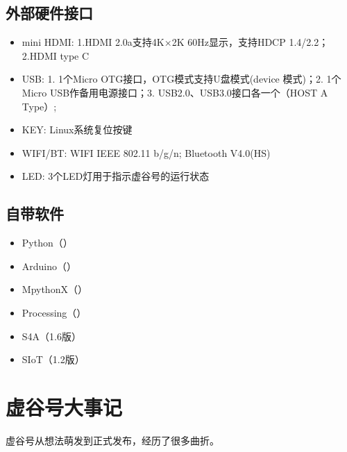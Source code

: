 \documentclass[letterpaper,10pt,english]{sphinxmanual}
\begin{document}
\subsection{外部硬件接口}
\label{\detokenize{01.about/1.2-function:id4}}\begin{itemize}
\item {} 
mini HDMI: 1.HDMI 2.0a支持4K×2K 60Hz显示，支持HDCP 1.4/2.2；2.HDMI type C

\item {} 
USB: 1. 1个Micro OTG接口，OTG模式支持U盘模式(device 模式)；2. 1个Micro USB作备用电源接口；3. USB2.0、USB3.0接口各一个（HOST A Type）;

\item {} 
KEY: Linux系统复位按键

\item {} 
WIFI/BT: WIFI IEEE 802.11 b/g/n; Bluetooth V4.0(HS)

\item {} 
LED: 3个LED灯用于指示虚谷号的运行状态

\end{itemize}


\subsection{自带软件}
\label{\detokenize{01.about/1.2-function:id5}}\begin{itemize}
\item {} 
Python（）

\item {} 
Arduino（）

\item {} 
MpythonX（）

\item {} 
Processing（）

\item {} 
S4A（1.6版）

\item {} 
SIoT（1.2版）

\end{itemize}


\section{虚谷号大事记}
\label{\detokenize{01.about/1.3-log::doc}}\label{\detokenize{01.about/1.3-log:id1}}
虚谷号从想法萌发到正式发布，经历了很多曲折。
\end{document}
